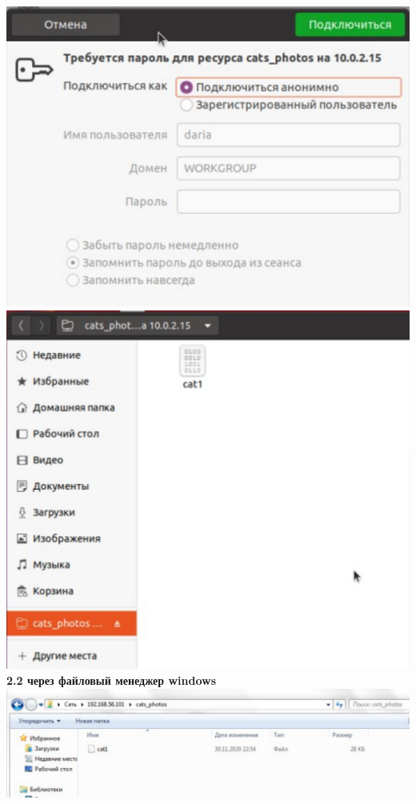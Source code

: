 \documentclass[12pt,a4paper]{scrartcl}
\begin{document}
\includegraphics[scale=10, width=15cm]{f71} \\[5pt]
\includegraphics[scale=10, width=15cm]{f8} \\[5pt]
\textnumero \textbf{2.2 через файловый менеджер windows} \\[5pt]
\includegraphics[scale=10, width=15cm]{f9}
\end{document}

